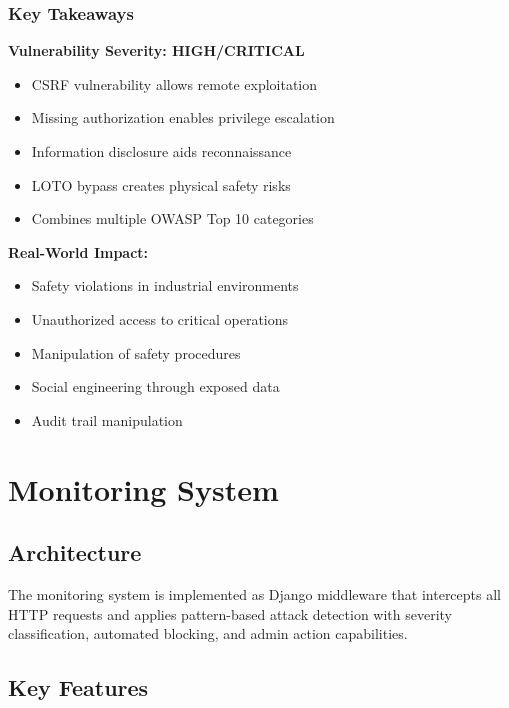 \documentclass[12pt,a4paper]{article}
\begin{document}
\subsubsection{Key Takeaways}

\textbf{Vulnerability Severity: HIGH/CRITICAL}
\begin{itemize}[leftmargin=*]
    \item CSRF vulnerability allows remote exploitation
    \item Missing authorization enables privilege escalation
    \item Information disclosure aids reconnaissance
    \item LOTO bypass creates physical safety risks
    \item Combines multiple OWASP Top 10 categories
\end{itemize}

\textbf{Real-World Impact:}
\begin{itemize}[leftmargin=*]
    \item Safety violations in industrial environments
    \item Unauthorized access to critical operations
    \item Manipulation of safety procedures
    \item Social engineering through exposed data
    \item Audit trail manipulation
\end{itemize}

\newpage

\section{Monitoring System}

\subsection{Architecture}

The monitoring system is implemented as Django middleware that intercepts all HTTP requests and applies pattern-based attack detection with severity classification, automated blocking, and admin action capabilities.

\subsection{Key Features}
\end{document}
